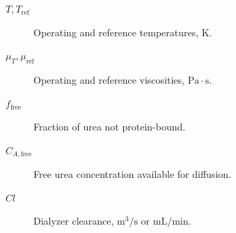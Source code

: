 \begin{description}
    \item[\(T, T_{\text{ref}}\)] Operating and reference temperatures, \(\mathrm{K}\).
    \item[\(\mu_T, \mu_{\text{ref}}\)] Operating and reference viscosities, \(\mathrm{Pa \cdot s}\).
    \item[\(f_{\text{free}}\)] Fraction of urea not protein-bound.
    \item[\(C_{A,\text{free}}\)] Free urea concentration available for diffusion.
    \item[\(Cl\)] Dialyzer clearance, \(\mathrm{m^3/s}\) or \(\mathrm{mL/min}\).
\end{description}


